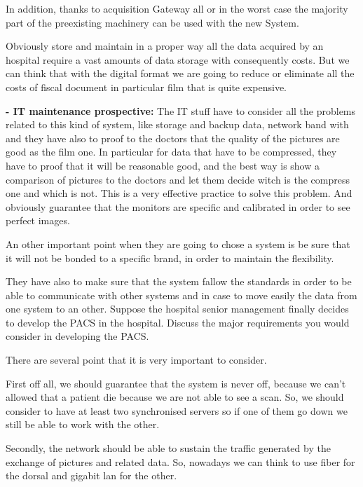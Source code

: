 \documentclass[a4 paper,12pt]{article}
\begin{document}
        In addition, thanks to acquisition Gateway all or in the worst case the majority part of the preexisting machinery can be used with the new System.
        
        Obviously store and maintain in a proper way all the data acquired by an hospital require a vast amounts of data storage with consequently costs. But we can think that with the digital format we are going to reduce or eliminate all the costs of fiscal document in particular film that is quite expensive.
    
    \textbf{- IT maintenance prospective:} 
        The IT stuff have to consider all the problems related to this kind of system, like storage and backup data, network band with and they have also to proof to the doctors that the quality of the pictures are good as the film one. In particular for data that have to be compressed, they have to proof that it will be reasonable good, and the best way is show a comparison of pictures to the doctors and let them decide witch is the compress one and which is not. This is a very effective practice to solve this problem. And obviously guarantee that the monitors are specific and calibrated in order to see perfect images.
        
        An other important point when they are going to chose a system is be sure that it will not be bonded to a specific brand, in order to maintain the flexibility.
        
        They have also to make sure that the system fallow the standards in order to be able to communicate with other systems and in case to move easily the data from one system to an other.
\newpage
{}
    Suppose the hospital senior management finally decides to develop the PACS in the hospital. Discuss the major requirements you would consider in developing the
    PACS.
    
    \solution
    
        There are several point that it is very important to consider.
        
        First off all, we should guarantee that the system is never off, because we can't allowed that a patient die because we are not able to see a scan. So, we should consider to have at least two synchronised servers so if one of them go down we still be able to work with the other.
        
        Secondly, the network should be able to sustain the traffic generated by the exchange of pictures and related data. So, nowadays we can think to use fiber for the dorsal and gigabit lan for the other.
        
\end{document}
